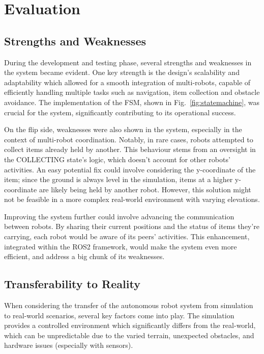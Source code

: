 \documentclass[conference]{IEEEtran}
\begin{document}
\section{Evaluation}
\subsection{Strengths and Weaknesses}

During the development and testing phase, several strengths and weaknesses in the system became evident. One key strength is the design's scalability and adaptability which allowed for a smooth integration of multi-robots, capable of efficiently handling multiple tasks such as navigation, item collection and obstacle avoidance. The implementation of the FSM, shown in Fig.~\ref{fig:statemachine}, was crucial for the system, significantly contributing to its operational success.

On the flip side, weaknesses were also shown in the system, especially in the context of multi-robot coordination. Notably, in rare cases, robots attempted to collect items already held by another. This behaviour stems from an oversight in the COLLECTING state's logic, which doesn't account for other robots' activities. An easy potential fix could involve considering the y-coordinate of the item; since the ground is always level in the simulation, items at a higher y-coordinate are likely being held by another robot. However, this solution might not be feasible in a more complex real-world environment with varying elevations.

Improving the system further could involve advancing the communication between robots. By sharing their current positions and the status of items they're carrying, each robot would be aware of its peers' activities. This enhancement, integrated within the ROS2 framework, would make the system even more efficient, and address a big chunk of its weaknesses.

\subsection{Transferability to Reality}
When considering the transfer of the autonomous robot system from simulation to real-world scenarios, several key factors come into play. The simulation provides a controlled environment which significantly differs from the real-world, which can be unpredictable due to the varied terrain, unexpected obstacles, and hardware issues (especially with sensors).
\end{document}
